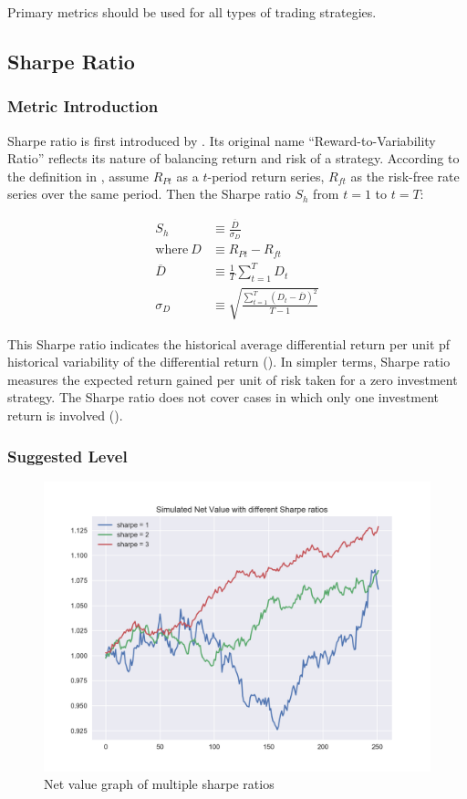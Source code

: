 \documentclass[12pt]{article}
\begin{document}
Primary metrics should be used for all types of trading strategies.

\subsection{Sharpe Ratio}

\subsubsection*{Metric Introduction}

Sharpe ratio is first introduced by \cite{sharpe1966}. Its original name \enquote{Reward-to-Variability Ratio} reflects its nature of balancing return and risk of a strategy. According to the definition in \cite{sharpe1994}, assume \(R_{Pt}\) as a \(t\)-period return series, \(R_{ft}\) as the risk-free rate series over the same period. Then the Sharpe ratio \(S_h\) from \(t=1\) to \(t=T\):

\begin{align*}
  S_h &\equiv \frac{\overline{D}}{\sigma_D} \\
  \text{where}~D &\equiv R_{Pt} - R_{ft} \\
  \overline{D} &\equiv \frac{1}{T} \sum_{t=1}^T D_t \\
  \sigma_D &\equiv \sqrt{\frac{\sum_{t=1}^T (D_t-\overline{D})^2}{T-1}}
\end{align*}

This Sharpe ratio indicates the historical average differential return per unit pf historical variability of the differential return (\cite{sharpe1966}). In simpler terms, Sharpe ratio measures the expected return gained per unit of risk taken for a zero investment strategy. The Sharpe ratio does not cover cases in which only one investment return is involved (\cite{sharpe1994}).

\subsubsection*{Suggested Level}

\begin{figure}[h!]
  \centering
  \includegraphics[scale=0.78]{./ref/figure/sharpe_nav_1200.png}
  \caption{Net value graph of multiple sharpe ratios}
  \label{fig:sharpe_navs}
\end{figure}
\end{document}
